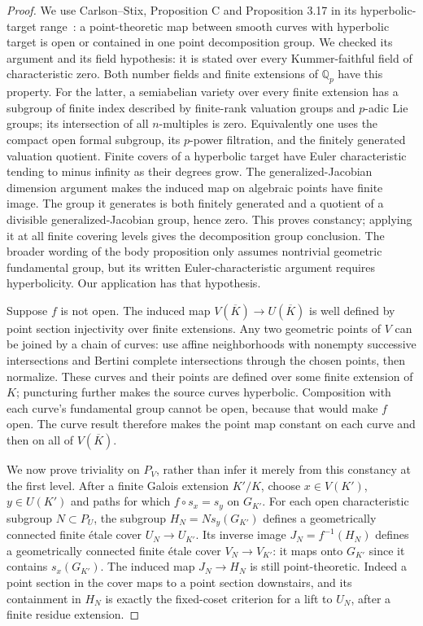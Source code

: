 \begin{proof}
We use Carlson--Stix, Proposition C and Proposition 3.17 in its
hyperbolic-target range~\cite{F-CarlsonStix}: a point-theoretic
map between smooth curves with hyperbolic target is open or
contained in one point decomposition group. We checked its
argument and its field hypothesis: it is stated over every
Kummer-faithful field of characteristic zero. Both number fields
and finite extensions of $\mathbb Q_p$ have this property.
For the latter, a semiabelian variety over every finite extension
has a subgroup of finite index described by finite-rank valuation
groups and $p$-adic Lie groups; its intersection of all $n$-multiples
is zero. Equivalently one uses the compact open formal subgroup,
its $p$-power filtration, and the finitely generated valuation
quotient. Finite covers of a hyperbolic target have Euler
characteristic tending to minus infinity as their degrees grow.
The generalized-Jacobian dimension argument makes the induced
map on algebraic points have finite image. The group it generates
is both finitely generated and a quotient of a divisible
generalized-Jacobian group, hence zero. This proves constancy;
applying it at all finite covering levels gives the decomposition
group conclusion. The broader wording of the body proposition
only assumes nontrivial geometric fundamental group, but its
written Euler-characteristic argument requires hyperbolicity.
Our application has that hypothesis.

Suppose $f$ is not open. The induced map
$V(\overline K)\to U(\overline K)$ is well defined by point
section injectivity over finite extensions. Any two geometric
points of $V$ can be joined by a chain of curves: use affine
neighborhoods with nonempty successive intersections and
Bertini complete intersections through the chosen points,
then normalize. These curves and their points are defined over
some finite extension of $K$; puncturing further makes the source
curves hyperbolic. Composition with each curve's fundamental
group cannot be open, because that would make $f$ open. The
curve result therefore makes the point map constant on each
curve and then on all of $V(\overline K)$.

We now prove triviality on $P_V$, rather than infer it merely
from this constancy at the first level. After a finite Galois
extension $K'/K$, choose $x\in V(K')$, $y\in U(K')$ and
paths for which $f\circ s_x=s_y$ on $G_{K'}$. For each open
characteristic subgroup $N\subset P_U$, the subgroup
$H_N=N s_y(G_{K'})$ defines a geometrically connected finite
\'etale cover $U_N\to U_{K'}$. Its inverse image
$J_N=f^{-1}(H_N)$ defines a geometrically connected finite
\'etale cover $V_N\to V_{K'}$: it maps onto $G_{K'}$ since
it contains $s_x(G_{K'})$. The induced map $J_N\to H_N$
is still point-theoretic. Indeed a point section in the cover
maps to a point section downstairs, and its containment in
$H_N$ is exactly the fixed-coset criterion for a lift to
$U_N$, after a finite residue extension.


\end{proof}
